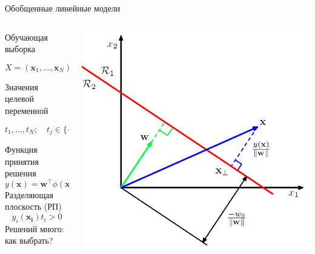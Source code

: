 \documentclass[10pt]{beamer}
\begin{document}
\begin{frame}{Обобщенные линейные модели}

\begin{columns}[T]
    \begin{column}{.5\textwidth}
    Обучающая выборка
    
	$$X = (\mathbf{x}_1, \ldots, \mathbf{x}_N)$$
	
	Значения целевой переменной	
	
	$$t_1, \ldots, t_N; \quad t_j \in \{-1, +1\}$$
	    
    Функция принятия решения
    \[
    y(\mathbf{x}) = \mathbf{w}^\top \phi(\mathbf{x}) + b
    \]
    Разделяющая плоскость (РП)
    \[
    y_i(\mathbf{x_i}) t_i > 0
    \]
    Решений много: как выбрать?
    \end{column}
       
    \begin{column}{.5\textwidth}
    \vspace{-0em}
	\begin{center}
   		\includegraphics[scale=0.3]{images/linear.png}
    \end{center}
    \end{column}
  \end{columns}
  
\end{frame}
\end{document}
